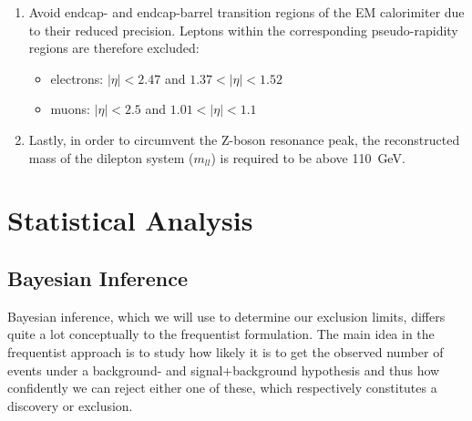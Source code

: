 \documentclass{article}
\begin{document}
\begin{titlepage}
\begin{enumerate}
   \item  Avoid endcap- and endcap-barrel transition regions of the EM calorimiter due to their reduced precision. Leptons within the corresponding pseudo-rapidity regions are therefore excluded: 
      \begin{itemize}
     \item electrons: $|\eta| < 2.47$ and $1.37 < |\eta| < 1.52$
     \item muons: $|\eta| < 2.5$ and $1.01 < |\eta| < 1.1$
   \end{itemize}
   
  \item Lastly, in order to circumvent the Z-boson resonance peak, the reconstructed mass of the dilepton system ($m_{ll}$) is required to be above \SI{110}{\giga \eV}.
\end{enumerate}







\section{Statistical Analysis}



 \subsection{Bayesian Inference}\label{sec:Bayes}
Bayesian inference, which we will use to determine our exclusion limits, differs quite a lot conceptually to the frequentist formulation. The main idea in the frequentist approach is to study how likely it is to get the observed number of events under a background- and signal+background hypothesis and thus how confidently we can reject either one of these, which respectively constitutes a discovery or exclusion. 



\end{titlepage}
\end{document}
